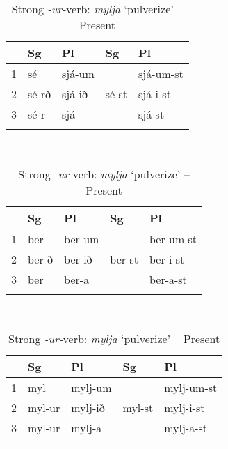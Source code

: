 \documentclass[output=paper]{langscibook}
\begin{document}
\begin{table}
\caption{Strong verbs} \label{woodstrong} 
\begin{subtable}{\linewidth}\centering
\caption{Strong \textit{-rð-}verb: \textit{sjá} `see' -- Present}
\begin{tabular}{*5{l}}
\lsptoprule
  & {Sg} & {Pl}  & {Sg} & {Pl}\\\midrule
1 & sé    & sjá-um  &       &  sjá-um-st\\ 
2 & sé-rð & sjá-ið  & sé-st &  sjá-i-st \\ 
3 & sé-r  & sjá     &       & sjá-st    \\ 
\lspbottomrule
\end{tabular}
\end{subtable}\medskip\\
\begin{subtable}{\linewidth}\centering
\caption{Strong \textit{-ð-}verb: \textit{bera} `carry' -- Present}
\begin{tabular}{*5{l}}
\lsptoprule
& {Sg} & {Pl}  & {Sg} & {Pl}\\\midrule
1 & ber & ber-um && ber-um-st   \\
2 & ber-ð & ber-ið & ber-st & ber-i-st  \\
3 & ber & ber-a & 		& ber-a-st \\
\lspbottomrule
\end{tabular}
\end{subtable}\medskip\\
\begin{subtable}{\linewidth}\centering
\caption{Strong \textit{-ur-}verb: \textit{mylja} `pulverize' -- Present}
\begin{tabular}{*5{l}}
\lsptoprule
  & {Sg} & {Pl}  & {Sg} & {Pl} \\\midrule
1 & myl & mylj-um  	&  			&  mylj-um-st \\
2 & myl-ur & mylj-ið 		& myl-st 	&  mylj-i-st  \\
3 & myl-ur  & mylj-a 		& 		& mylj-a-st  \\
\lspbottomrule
\end{tabular}
\end{subtable}

\end{table} 
\end{document}
